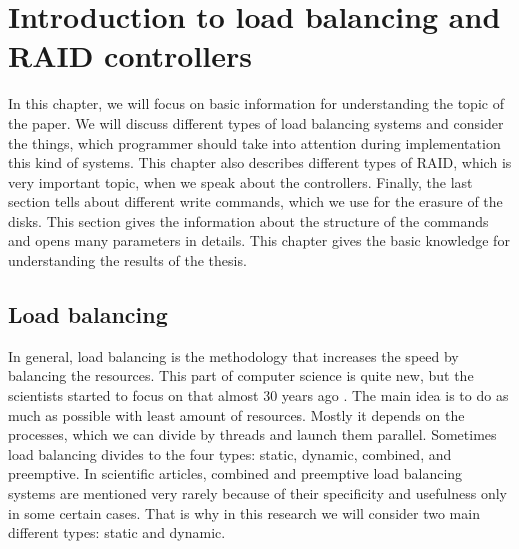 \chapter{Introduction to load balancing and RAID controllers}
\label{chap2:title}

In this chapter, we will focus on basic information for understanding the topic of the paper. We will discuss different types of load balancing systems and consider the things, which programmer should take into attention during implementation this kind of systems. This chapter also describes different types of RAID, which is very important topic, when we speak about the controllers. Finally, the last section tells about different write commands, which we use for the erasure of the disks. This section gives the information about the structure of the commands and opens many parameters in details. This chapter gives the basic knowledge for understanding the results of the thesis.

\newpage
\section{Load balancing}
In general, load balancing is the methodology that increases the speed by balancing the resources. This part of computer science is quite new, but the scientists started to focus on that almost 30 years ago \cite{stat_load_bal_1985}. The main idea is to do as much as possible with least amount of resources. Mostly it depends on the processes, which we can divide by threads and launch them parallel. Sometimes load balancing divides to the four types: static, dynamic, combined, and preemptive. In scientific articles, combined and preemptive load balancing systems are mentioned very rarely because of their specificity and usefulness only in some certain cases. That is why in this research we will consider two main different types: static and dynamic.

